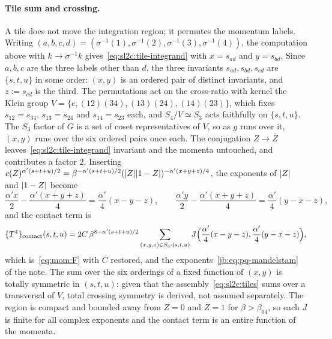 \paragraph{Tile sum and crossing.}
A tile does not move the integration region; it permutes the momentum labels.
Writing $(a, b, c, d) = (\sigma^{-1}(1), \sigma^{-1}(2), \sigma^{-1}(3), \sigma^{-1}(4))$, the computation above with $k \to \sigma^{-1} k$ gives~\eqref{eq:sl2c:tile-integrand} with $x = s_{ad}$ and $y = s_{bd}$.
Since $a, b, c$ are the three labels other than $d$, the three invariants $s_{ad}, s_{bd}, s_{cd}$ are $\{ s, t, u \}$ in some order: $(x, y)$ is an ordered pair of distinct invariants, and $z := s_{cd}$ is the third.
The permutations act on the cross-ratio with kernel the Klein group $V = \{ e, (12)(34), (13)(24), (14)(23) \}$, which fixes $s_{12} = s_{34}$, $s_{13} = s_{24}$ and $s_{14} = s_{23}$ each, and $S_4 / V \simeq S_3$ acts faithfully on $\{ s, t, u \}$.
The $S_3$ factor of $G$ is a set of coset representatives of $V$, so as $g$ runs over it, $(x, y)$ runs over the six ordered pairs once each.
The conjugation $Z \to \bar Z$ leaves~\eqref{eq:sl2c:tile-integrand} invariant and the momenta untouched, and contributes a factor $2$.
Inserting $c(Z)^{\alpha' (s + t + u) / 2} = \beta^{- \alpha' (s + t + u) / 2} ({|Z|} {|1 - Z|})^{- \alpha' (x + y + z) / 4}$, the exponents of ${|Z|}$ and ${|1 - Z|}$ become
\begin{equation}
  \frac{\alpha' x}{2} - \frac{\alpha' (x + y + z)}{4}
    = \frac{\alpha'}{4} (x - y - z),
  \qquad
  \frac{\alpha' y}{2} - \frac{\alpha' (x + y + z)}{4}
    = \frac{\alpha'}{4} (y - x - z),
\end{equation}
and the contact term is
\begin{equation}
  \label{eq:sl2c:contact}
  \{ T^4 \}_{\rm contact}(s, t, u)
    = 2 C \, \beta^{8 - \alpha' (s + t + u) / 2} \sum_{(x, y, z) \in S_3 \cdot (s, t, u)} J\Big( \frac{\alpha'}{4} (x - y - z), \frac{\alpha'}{4} (y - x - z) \Big),
\end{equation}
which is~\eqref{eq:mom:F} with $C$ restored, and the exponents~\eqref{jb:eq:pq-mandelstam} of the note.
The sum over the six orderings of a fixed function of $(x, y)$ is totally symmetric in $(s, t, u)$: given that the assembly~\eqref{eq:sl2c:tiles} sums over a transversal of $V$, total crossing symmetry is derived, not assumed separately.
The region is compact and bounded away from $Z = 0$ and $Z = 1$ for $\beta > \beta_{04}$, so each $J$ is finite for all complex exponents and the contact term is an entire function of the momenta.

